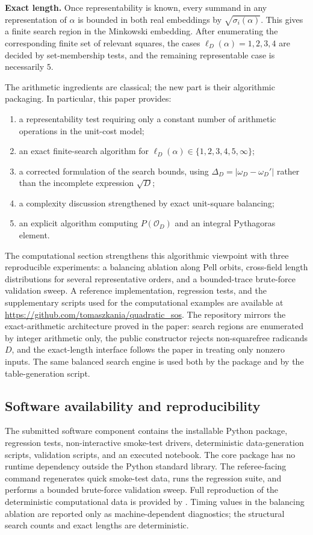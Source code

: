 \documentclass[manuscript,screen]{acmart}
\theoremstyle{plain}
\theoremstyle{definition}
\theoremstyle{nonitalicremark}
\newcommand{\OD}{\mathcal{O}_D}
\newcommand{\len}{\ell}
\newcommand{\wD}{\omega_D}
\newcommand{\wDp}{\omega_D'}
\newcommand{\sig}{\sigma}
\begin{document}
\noindent\textbf{Exact length.}
Once representability is known, every summand in any representation of $\alpha$ is bounded in
both real embeddings by $\sqrt{\sig_i(\alpha)}$. This gives a finite search region in the
Minkowski embedding. After enumerating the corresponding finite set of relevant squares, the cases
$\len_D(\alpha)=1,2,3,4$ are decided by set-membership tests, and the remaining representable
case is necessarily $5$.

The arithmetic ingredients are classical; the new part is their algorithmic packaging. In
particular, this paper provides:
\begin{enumerate}[label=\textup{(\roman*)},itemsep=0.25em]
\item a representability test requiring only a constant number of arithmetic operations in the
unit-cost model;
\item an exact finite-search algorithm for
$\len_D(\alpha) \in \{1,2,3,4,5,\infty\}$;
\item a corrected formulation of the search bounds, using
$\Delta_D = |\wD-\wDp|$ rather than the incomplete expression $\sqrt{D}$;
\item a complexity discussion strengthened by exact unit-square balancing;
\item an explicit algorithm computing $P(\OD)$ and an integral Pythagoras element.
\end{enumerate}

The computational section strengthens this algorithmic viewpoint with three reproducible
experiments: a balancing ablation along Pell orbits, cross-field length distributions for several
representative orders, and a bounded-trace brute-force validation sweep.
A reference implementation, regression tests, and the supplementary scripts used for the
computational examples are available at
\url{https://github.com/tomaszkania/quadratic_sos}. The repository mirrors the exact-arithmetic
architecture proved in the paper: search regions are enumerated by integer arithmetic only, the
public constructor rejects non-squarefree radicands $D$, and the exact-length interface follows the
paper in treating only nonzero inputs. The same balanced search engine is used both by the package
and by the table-generation script.

\subsection*{Software availability and reproducibility}
The submitted software component contains the installable Python package, regression tests,
non-interactive smoke-test drivers, deterministic data-generation scripts, validation scripts, and
an executed notebook. The core package has no runtime dependency outside the Python standard
library. The referee-facing command
 regenerates quick smoke-test data, runs the regression
suite, and performs a bounded brute-force validation sweep. Full reproduction of the deterministic
computational data is provided by . Timing values in
the balancing ablation are reported only as machine-dependent diagnostics; the structural search
counts and exact lengths are deterministic.
\end{document}
